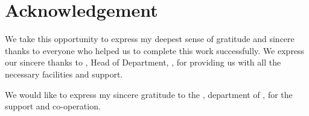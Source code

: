 \chapter*{Acknowledgement}%
%



\par We take this opportunity to express my deepest sense of gratitude and sincere thanks to everyone who helped us to complete this work successfully. We express our sincere thanks to \hod, Head of Department, \dept, \college\hspace*{2pt} for providing  us with all the necessary facilities and support.\par

We would like to express my sincere gratitude to the \projcordinatorA, \hspace*{2pt} department of \hspace*{2pt} \dept, \hspace*{2pt} \college\hspace*{2pt} for the support and co-operation.


\vspace*{30pt}
\begin{flushright}
	\textbf{\studentB}\\
\end{flushright}
\thispagestyle{plain}
